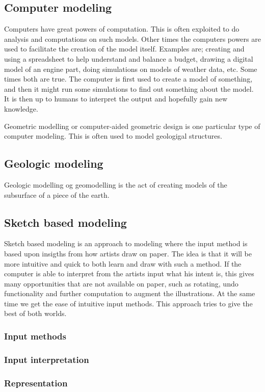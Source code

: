 \documentclass[a4paper,10pt]{article}
\begin{document}
\subsection{Computer modeling}
Computers have great powers of computation. This is often exploited to do analysis and computations on such models. 
Other times the computers powers are used to facilitate the creation of the model itself. Examples are; creating and using a spreadsheet to help understand and balance a budget, drawing a digital model of an engine part, doing simulations on models of weather data, etc. Some times both are true. The computer is first used to create a model of something, and then it might run some simulations to find out something about the model. It is then up to humans to interpret the output and hopefully gain new knowledge.

Geometric modelling or computer-aided geometric design is one particular type of computer modeling. This is often used to model geologigal structures.

\subsection{Geologic modeling}
Geologic modelling og geomodelling is the act of creating models of the subsurface of a piece of the earth.

\subsection{Sketch based modeling}
Sketch based modeling is an approach to modeling where the input method is based upon insigths from how artists draw on paper. The idea is that it will be more intuitive and quick to both learn and draw with such a method. If the computer is able to interpret from the artists input what his intent is, this gives many opportunities that are not available on paper, such as rotating, undo functionality and further computation to augment the illustrations. At the same time we get the ease of intuitive input methods. This approach tries to give the best of both worlds.
\subsubsection{Input methods}
\subsubsection{Input interpretation}
\subsubsection{Representation}
\end{document}
